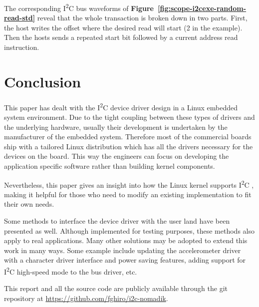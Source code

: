 \documentclass[a4paper,10pt]{article}
\newcommand{\iic}{I\textsuperscript{2}C }
\newcommand{\reff}[1]{\textbf{Figure~\ref{#1}}}
\begin{document}
\begin{multicols}{2}
The corresponding \iic bus waveforms of \reff{fig:scope-i2cexe-random-read-std} 
reveal that the whole transaction is broken down in two parts. First, the host
writes the offset where the desired read will start (2 in the example).
Then the hosts sends a repeated start bit followed by a current address read
instruction.



\section{Conclusion}

This paper has dealt with the \iic device driver design in a Linux embedded
system environment.
Due to the tight coupling between these types of drivers and the underlying
hardware, usually their development is undertaken by the manufacturer of the
embedded system. Therefore most of the commercial boards ship with a tailored
Linux distribution which has all the drivers necessary for the devices on the
board. This way the engineers can focus on developing the application specific
software rather than building kernel components.

Nevertheless, this paper gives an insight into how the Linux kernel supports
\iic, making it helpful for those who need to modify an existing implementation
to fit their own needs.

Some methods to interface the device driver with the user land have been
presented as well. Although implemented for testing purposes, these methods
also apply to real applications. Many other solutions may be adopted to extend
this work in many ways. Some example include updating the accelerometer driver
with a character driver interface and power saving features, adding support
for \iic high-speed mode to the bus driver, etc.

This report and all the source code are publicly available through the git
repository at \url{https://github.com/fghiro/i2c-nomadik}.  


\nocite{rubini2005ldd}
\nocite{yaghmour2008bels}
\nocite{sally2009proles}
\nocite{love2010lkd}
\nocite{nxp-i2c-spec}
\nocite{linux-kernel-archive}
\nocite{loeliger2012git}




\end{multicols}
\end{document}
